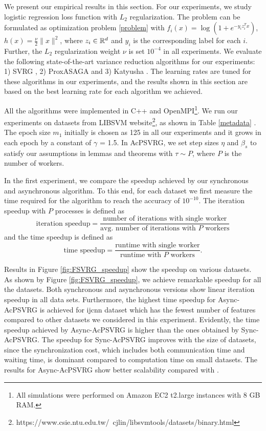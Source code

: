 We present our empirical results in this section. For our experiments, we study logistic regression loss function with $L_2$ regularization. The problem can be formulated as optimization problem \eqref{problem} with $f_i(x) = \log(1+e^{-y_iz^T_i{x}})$, $h(x) = \frac{\nu}{2}\|{x}\|^2$, where $z_i\in\mathbb{R}^d$ and $y_i$ is the corresponding label for each $i$. Further, the $L_2$ regularization weight $\nu$ is set $10^{-4}$ in all experiments. We evaluate the following state-of-the-art variance reduction algorithms for our experiments: 1) SVRG \cite{Johnson12}, 2) ProxASAGA \cite{pedregosa2017breaking} and 3) Katyusha \cite{Allen-Zhu17}. The learning rates are tuned for these algorithms in our experiments, and the results shown in this section are based on the best learning rate for each algorithm we achieved.


All the algorithms were implemented in C++ and OpenMPI{\footnote{All simulations were performed on Amazon EC2 t2.large instances with 8 GB RAM.}}. We run our experiments on datasets from LIBSVM website{\footnote{https://www.csie.ntu.edu.tw/~cjlin/libsvmtools/datasets/binary.html}}, as shown in Table \ref{metadata} . The epoch size $m_1$ initially is chosen as 125 in all our experiments and it grows in each epoch by a constant of $\gamma$ = 1.5. In AcPSVRG, we set step sizes $\eta$ and $\beta_s$ to satisfy our assumptions in lemmas and theorems with $\tau\sim P$, where $P$ is the number of workers.

In the first experiment, we compare the speedup achieved by our synchronous and asynchronous algorithm. To this
end, for each dataset we first measure the time required for the algorithm to reach the accuracy of $10^{-10}$. The iteration speedup with $P$ processes is defined as 
\[
 \text{iteration speedup} = \frac{\text{number of iterations with single worker}}{\text{avg. number of iterations with $P$ workers}} \]
and the time speedup is defined as 
 \[
  \text{time speedup} = \frac{\text{runtime with single worker}}{\text{runtime with $P$ workers}}.
\]


Results in Figure \eqref{fig:FSVRG_speedup} show the speedup on various datasets. As shown by Figure \eqref{fig:FSVRG_speedup}, we achieve remarkable speedup for all the datasets. Both synchronous and asynchronous versions show linear iteration speedup in all data sets. Furthermore, the highest
time speedup for Async-AcPSVRG is achieved for ijcnn dataset which has the fewest number of features compared to other datasets we considered in this experiment. Evidently, the time speedup achieved by Async-AcPSVRG is higher than the ones obtained by Sync-AcPSVRG. The speedup for Sync-AcPSVRG improves with the size of datasets, since the synchronization cost, which includes both communication time and waiting time, is dominant compared to computation time on small datasets. The results for Async-AcPSVRG show better scalability compared with \cite{Reddi2015,Meng2016}.



